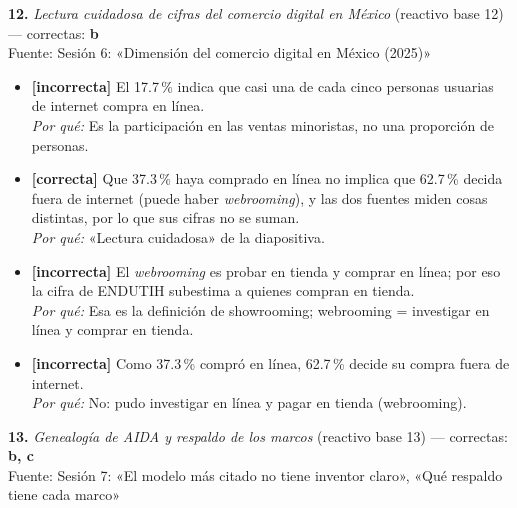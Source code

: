 \documentclass[10pt,letterpaper]{article}
\begin{document}
\vspace{3pt}\noindent\textbf{12.} \textit{Lectura cuidadosa de cifras del comercio digital en México} (reactivo base 12) — correctas: \textbf{b}\\[-1pt]
{\scriptsize Fuente: Sesión 6: «Dimensión del comercio digital en México (2025)»}
\begin{itemize}[leftmargin=1.2em,itemsep=0pt,topsep=1pt,parsep=0pt]
\item[\textbf{a)}] {\footnotesize \textbf{[incorrecta]} El 17.7\,\% indica que casi una de cada cinco personas usuarias de internet compra en línea.\\ \textit{Por qué:} Es la participación en las ventas minoristas, no una proporción de personas.}
\item[\textbf{b)}] {\footnotesize \textbf{[correcta]} Que 37.3\,\% haya comprado en línea no implica que 62.7\,\% decida fuera de internet (puede haber \textit{webrooming}), y las dos fuentes miden cosas distintas, por lo que sus cifras no se suman.\\ \textit{Por qué:} «Lectura cuidadosa» de la diapositiva.}
\item[\textbf{c)}] {\footnotesize \textbf{[incorrecta]} El \textit{webrooming} es probar en tienda y comprar en línea; por eso la cifra de ENDUTIH subestima a quienes compran en tienda.\\ \textit{Por qué:} Esa es la definición de showrooming; webrooming = investigar en línea y comprar en tienda.}
\item[\textbf{d)}] {\footnotesize \textbf{[incorrecta]} Como 37.3\,\% compró en línea, 62.7\,\% decide su compra fuera de internet.\\ \textit{Por qué:} No: pudo investigar en línea y pagar en tienda (webrooming).}
\end{itemize}
\vspace{3pt}\noindent\textbf{13.} \textit{Genealogía de AIDA y respaldo de los marcos} (reactivo base 13) — correctas: \textbf{b, c}\\[-1pt]
{\scriptsize Fuente: Sesión 7: «El modelo más citado no tiene inventor claro», «Qué respaldo tiene cada marco»}
\end{document}
